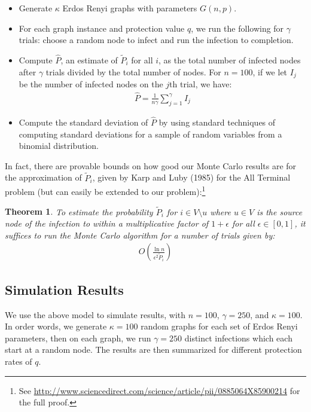 \documentclass{article}
\theoremstyle{plain}
\newtheorem{theorem}{Theorem}
\begin{document}
\begin{itemize}
  \item Generate $\kappa$ Erdos Renyi graphs with parameters $G(n, p)$.
  \item For each graph instance and protection value $q$, we run the following for $\gamma$ trials: choose a random node to infect and run the infection to completion.
  \item Compute $\hat{P}$, an estimate of $\tilde{P}_i$ for all $i$, as the total number of infected nodes after $\gamma$ trials divided by the total number of nodes. For $n = 100$, if we let $I_j$ be the number of infected nodes on the $j$th trial, we have:
    \begin{eqnarray}
      \hat{P} = \frac{1}{n \gamma} \sum_{j=1}^{\gamma} I_j
    \end{eqnarray}
  \item Compute the standard deviation of $\hat{P}$ by using standard techniques of computing standard deviations for a sample of random variables from a binomial distribution.
\end{itemize}

In fact, there are provable bounds on how good our Monte Carlo results are for the approximation of $\tilde{P}_i$, given by Karp and Luby (1985) for the All Terminal problem (but can easily be extended to our problem):\footnote{See \url{http://www.sciencedirect.com/science/article/pii/0885064X85900214} for the full proof.}

\begin{theorem}
  To estimate the probability $\tilde{P}_i$ for $i \in V \setminus u$ where $u \in V$ is the source node of the infection to within a multiplicative factor of $1 + \epsilon$ for all $\epsilon \in [0,1]$, it suffices to run the Monte Carlo algorithm for a number of trials given by:
  \begin{eqnarray}
    O \left( \frac{\ln n}{\epsilon^2 \tilde{P}_i} \right)
  \end{eqnarray}
\end{theorem}

\subsection{Simulation Results}

We use the above model to simulate results, with $n = 100$, $\gamma = 250$, and $\kappa = 100$. In order words, we generate $\kappa = 100$ random graphs for each set of Erdos Renyi parameters, then on each graph, we run $\gamma = 250$ distinct infections which each start at a random node. The results are then summarized for different protection rates of $q$.
\end{document}
